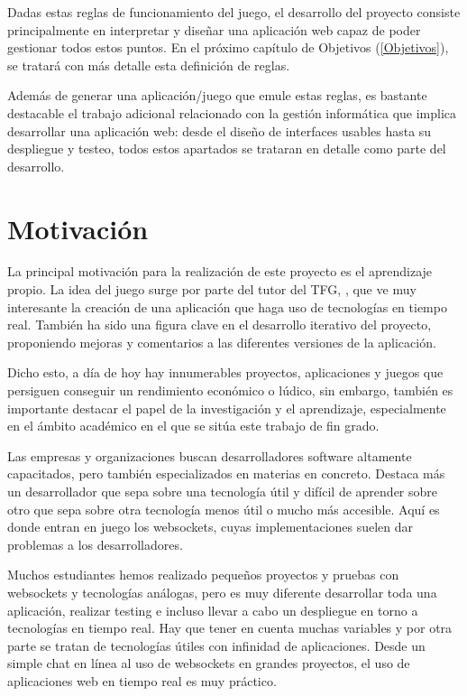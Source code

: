 Dadas estas reglas de funcionamiento del juego, el desarrollo del proyecto consiste principalmente en
interpretar y diseñar una aplicación web capaz de poder gestionar todos estos puntos. En el próximo capítulo de Objetivos (\ref{Objetivos}),
se tratará con más detalle esta definición de reglas.

Además de generar una aplicación/juego que emule estas reglas, es bastante destacable el trabajo adicional relacionado con la gestión informática que
implica desarrollar una aplicación web: desde el diseño de interfaces usables hasta su despliegue y testeo, todos estos apartados se trataran en detalle
como parte del desarrollo.

\section{Motivación}

La principal motivación para la realización de este proyecto es el aprendizaje propio. La idea del juego
surge por parte del tutor del TFG, \nombretutor, que ve muy interesante la creación de una aplicación que haga uso de tecnologías en
tiempo real. También ha sido una figura clave en el desarrollo iterativo del proyecto, proponiendo mejoras y comentarios
a las diferentes versiones de la aplicación.

Dicho esto, a día de hoy hay innumerables proyectos, aplicaciones y juegos que persiguen conseguir un rendimiento económico o lúdico, sin embargo, también es importante destacar el papel
de la investigación y el aprendizaje, especialmente en el ámbito académico en el que se sitúa este trabajo de fin grado.

Las empresas y organizaciones buscan desarrolladores software altamente capacitados, pero también especializados en materias en concreto.
Destaca más un desarrollador que sepa sobre una tecnología útil y difícil de aprender sobre otro que sepa
sobre otra tecnología menos útil o mucho más accesible. Aquí es donde entran en juego los websockets, cuyas implementaciones suelen dar problemas 
a los desarrolladores.

Muchos estudiantes hemos realizado pequeños proyectos y pruebas con websockets y tecnologías análogas, pero es muy diferente desarrollar toda una aplicación, realizar testing e
incluso llevar a cabo un despliegue en torno a tecnologías en tiempo real. Hay que tener en cuenta muchas variables y por otra parte se tratan de tecnologías útiles
con infinidad de aplicaciones. Desde un simple chat en línea al uso de websockets en grandes proyectos, el uso de aplicaciones web en tiempo real es muy práctico.


